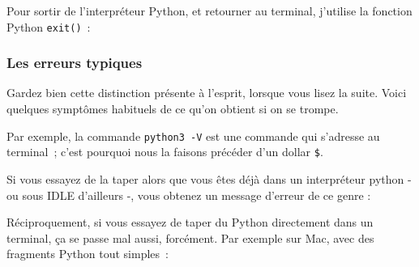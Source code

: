     Pour sortir de l'interpréteur Python, et retourner au terminal,
j'utilise la fonction Python \texttt{exit()}~:

\begin{Shaded}
\begin{Highlighting}[frame=lines,framerule=0.6mm,rulecolor=\color{asisframecolor}]
\OperatorTok{>>>} 
\OperatorTok{>>>} 
\end{Highlighting}
\end{Shaded}

    \hypertarget{les-erreurs-typiques}{%
\subsubsection{Les erreurs typiques}\label{les-erreurs-typiques}}

Gardez bien cette distinction présente à l'esprit, lorsque vous lisez la
suite. Voici quelques symptômes habituels de ce qu'on obtient si on se
trompe.

Par exemple, la commande \texttt{python3\ -V} est une commande qui
s'adresse au terminal~; c'est pourquoi nous la faisons précéder d'un
dollar \texttt{\$}.

Si vous essayez de la taper alors que vous êtes déjà dans un
interpréteur python - ou sous IDLE d'ailleurs -, vous obtenez un message
d'erreur de ce genre :

\begin{Shaded}
\begin{Highlighting}[frame=lines,framerule=0.6mm,rulecolor=\color{asisframecolor}]
\OperatorTok{>>>} 
\BuiltInTok{:}
   \OperatorTok{<}\OperatorTok{>}
\end{Highlighting}
\end{Shaded}

    Réciproquement, si vous essayez de taper du Python directement dans un
terminal, ça se passe mal aussi, forcément. Par exemple sur Mac, avec
des fragments Python tout simples~:

\begin{Shaded}
\begin{Highlighting}[frame=lines,framerule=0.6mm,rulecolor=\color{asisframecolor}]
\end{Highlighting}
\end{Shaded}

